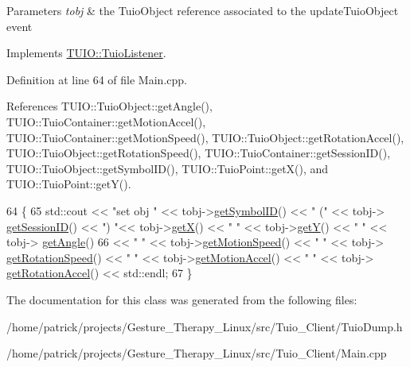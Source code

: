 \begin{DoxyParams}{Parameters}
{\em tobj} & the Tuio\+Object reference associated to the update\+Tuio\+Object event \\
\hline
\end{DoxyParams}


Implements \hyperlink{class_t_u_i_o_1_1_tuio_listener_a27a13b031781a609c08bc40548d2e42d}{T\+U\+I\+O\+::\+Tuio\+Listener}.



Definition at line 64 of file Main.\+cpp.



References T\+U\+I\+O\+::\+Tuio\+Object\+::get\+Angle(), T\+U\+I\+O\+::\+Tuio\+Container\+::get\+Motion\+Accel(), T\+U\+I\+O\+::\+Tuio\+Container\+::get\+Motion\+Speed(), T\+U\+I\+O\+::\+Tuio\+Object\+::get\+Rotation\+Accel(), T\+U\+I\+O\+::\+Tuio\+Object\+::get\+Rotation\+Speed(), T\+U\+I\+O\+::\+Tuio\+Container\+::get\+Session\+I\+D(), T\+U\+I\+O\+::\+Tuio\+Object\+::get\+Symbol\+I\+D(), T\+U\+I\+O\+::\+Tuio\+Point\+::get\+X(), and T\+U\+I\+O\+::\+Tuio\+Point\+::get\+Y().


\begin{DoxyCode}
64                                                 \{
65     std::cout << \textcolor{stringliteral}{"set obj "} << tobj->\hyperlink{class_t_u_i_o_1_1_tuio_object_a0d0b9b6e48c657350559acded6a1e53b}{getSymbolID}() << \textcolor{stringliteral}{" ("} << tobj->
      \hyperlink{class_t_u_i_o_1_1_tuio_container_a84c29bb63b233dbfd22811dab5b62833}{getSessionID}() << \textcolor{stringliteral}{") "}<< tobj->\hyperlink{class_t_u_i_o_1_1_tuio_point_ad5bb767c0a7b151704b59a38793345f0}{getX}() << \textcolor{stringliteral}{" "} << tobj->\hyperlink{class_t_u_i_o_1_1_tuio_point_a6c591de33c3c0f0d5e8df159ce643b7a}{getY}() << \textcolor{stringliteral}{" "} << tobj->
      \hyperlink{class_t_u_i_o_1_1_tuio_object_a7757d3c07bb7014f50bc645016d58933}{getAngle}() 
66                 << \textcolor{stringliteral}{" "} << tobj->\hyperlink{class_t_u_i_o_1_1_tuio_container_ad8c0682163804a1f7e7e908d10272e20}{getMotionSpeed}() << \textcolor{stringliteral}{" "} << tobj->
      \hyperlink{class_t_u_i_o_1_1_tuio_object_af2257dc8331077f50a618cc61474bf81}{getRotationSpeed}() << \textcolor{stringliteral}{" "} << tobj->\hyperlink{class_t_u_i_o_1_1_tuio_container_ac2a47a96b789844909b2fffd17a63f36}{getMotionAccel}() << \textcolor{stringliteral}{" "} << tobj->
      \hyperlink{class_t_u_i_o_1_1_tuio_object_a228d923c770dd1fe767ea5899c1258b6}{getRotationAccel}() << std::endl;
67 \}
\end{DoxyCode}


The documentation for this class was generated from the following files\+:\begin{DoxyCompactItemize}
\item 
/home/patrick/projects/\+Gesture\+\_\+\+Therapy\+\_\+\+Linux/src/\+Tuio\+\_\+\+Client/Tuio\+Dump.\+h\item 
/home/patrick/projects/\+Gesture\+\_\+\+Therapy\+\_\+\+Linux/src/\+Tuio\+\_\+\+Client/Main.\+cpp\end{DoxyCompactItemize}
